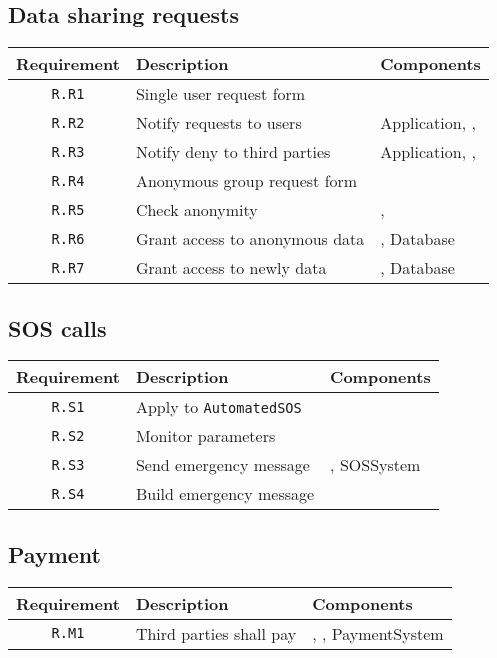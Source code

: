 \documentclass[../DD0.tex]{subfiles}
\newcommand{\tracMatrix}[3] {
  \begin{table}[h!]
    \centering
    \begin{tabularx}{\linewidth}{|c|X|X|}
      \hline
      \textbf{Requirement} & \textbf{Description} & \textbf{Components} \\
      #3
      \hline
    \end{tabularx}
    \label{tab:#2}
  \end{table}
}
\newcommand{\tracRow}[3] {
  \hline \texttt{R.#1} & #2 & #3 \\
}
\begin{document}
  \subsection{Data sharing requests}

    \tracMatrix{}{datasharingrequests}{
      \tracRow{R1}{Single user request form}{\RequestManager}
      \tracRow{R2}{Notify requests to users}{Application, \AccountManager, \RequestManager}
      \tracRow{R3}{Notify deny to third parties}{Application, \AccountManager, \RequestManager}
      \tracRow{R4}{Anonymous group request form}{\RequestManager}
      \tracRow{R5}{Check anonymity}{\RequestManager, \SetBuilder}
      \tracRow{R6}{Grant access to anonymous data}{\RequestManager, Database}
      \tracRow{R7}{Grant access to newly data}{\RequestManager, Database} %
    }

  \subsection{SOS calls}

    \tracMatrix{}{tracsoscalls}{
      \tracRow{S1}{Apply to \texttt{AutomatedSOS}}{\AccountManager}
      \tracRow{S2}{Monitor parameters}{\EmergencyDetector}
      \tracRow{S3}{Send emergency message}{\EmergencyDispatcher, SOSSystem}
      \tracRow{S4}{Build emergency message}{\EmergencyDispatcher}
    }

  \clearpage
  \subsection{Payment}

    \tracMatrix{}{tracpayment}{
      \tracRow{M1}{Third parties shall pay}{\AccountManager, \PaymentGateway, PaymentSystem}
    }
\end{document}
